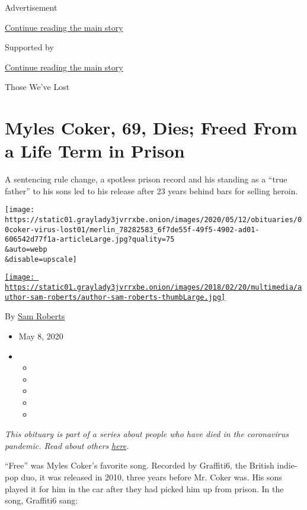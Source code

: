 Advertisement

\protect\hyperlink{after-top}{Continue reading the main story}

Supported by

\protect\hyperlink{after-sponsor}{Continue reading the main story}

Those We've Lost

\hypertarget{myles-coker-69-dies-freed-from-a-life-term-in-prison}{%
\section{Myles Coker, 69, Dies; Freed From a Life Term in
Prison}\label{myles-coker-69-dies-freed-from-a-life-term-in-prison}}

A sentencing rule change, a spotless prison record and his standing as a
``true father'' to his sons led to his release after 23 years behind
bars for selling heroin.

\texttt{[image: https://static01.graylady3jvrrxbe.onion/images/2020/05/12/obituaries/00coker-virus-lost01/merlin\_78282583\_6f7de55f-49f5-4902-ad01-606542d77f1a-articleLarge.jpg?quality=75\\\&auto=webp\\\&disable=upscale]}

\href{https://www.nytimes3xbfgragh.onion/by/sam-roberts}{\texttt{[image: https://static01.graylady3jvrrxbe.onion/images/2018/02/20/multimedia/author-sam-roberts/author-sam-roberts-thumbLarge.jpg]}}

By \href{https://www.nytimes3xbfgragh.onion/by/sam-roberts}{Sam Roberts}

\begin{itemize}
\item
  May 8, 2020
\item
  \begin{itemize}
  \item
  \item
  \item
  \item
  \item
  \end{itemize}
\end{itemize}

\emph{This obituary is part of a series about people who have died in
the coronavirus pandemic. Read about others}
\href{https://www.nytimes3xbfgragh.onion/series/people-who-have-died-of-the-coronavirus}{\emph{here}}\emph{.}

``Free'' was Myles Coker's favorite song. Recorded by Graffiti6, the
British indie-pop duo, it was released in 2010, three years before Mr.
Coker was. His sons played it for him in the car after they had picked
him up from prison. In the song, Graffiti6 sang:

